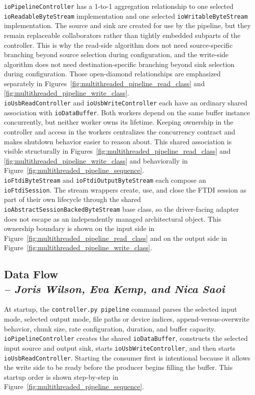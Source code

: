 \texttt{ioPipelineController} has a 1-to-1 aggregation relationship to one selected \texttt{ioReadableByteStream} implementation and one selected \texttt{ioWritableByteStream} implementation. The source and sink are created for use by the pipeline, but they remain replaceable collaborators rather than tightly embedded subparts of the controller. This is why the read-side algorithm does not need source-specific branching beyond source selection during configuration, and the write-side algorithm does not need destination-specific branching beyond sink selection during configuration. Those open-diamond relationships are emphasized separately in Figures~\ref{fig:multithreaded_pipeline_read_class} and \ref{fig:multithreaded_pipeline_write_class}. \\

\texttt{ioUsbReadController} and \texttt{ioUsbWriteController} each have an ordinary shared association with \texttt{ioDataBuffer}. Both workers depend on the same buffer instance concurrently, but neither worker owns its lifetime. Keeping ownership in the controller and access in the workers centralizes the concurrency contract and makes shutdown behavior easier to reason about. This shared association is visible structurally in Figures~\ref{fig:multithreaded_pipeline_read_class} and \ref{fig:multithreaded_pipeline_write_class} and behaviorally in Figure~\ref{fig:multithreaded_pipeline_sequence}. \\

\texttt{ioFtdiByteStream} and \texttt{ioFtdiOutputByteStream} each compose an \texttt{ioFtdiSession}. The stream wrappers create, use, and close the FTDI session as part of their own lifecycle through the shared \texttt{ioAbstractSessionBackedByteStream} base class, so the driver-facing adapter does not escape as an independently managed architectural object. This ownership boundary is shown on the input side in Figure~\ref{fig:multithreaded_pipeline_read_class} and on the output side in Figure~\ref{fig:multithreaded_pipeline_write_class}.

\subsection{Data Flow \\
\small{\textit{-- Joris Wilson, Eva Kemp, and Nica Saoi}}}
\label{Section::Data Flow}

At startup, the \texttt{controller.py pipeline} command parses the selected input mode, selected output mode, file paths or device indices, append-versus-overwrite behavior, chunk size, rate configuration, duration, and buffer capacity. \texttt{ioPipelineController} creates the shared \texttt{ioDataBuffer}, constructs the selected input source and output sink, starts \texttt{ioUsbWriteController}, and then starts \texttt{ioUsbReadController}. Starting the consumer first is intentional because it allows the write side to be ready before the producer begins filling the buffer. This startup order is shown step-by-step in Figure~\ref{fig:multithreaded_pipeline_sequence}.

